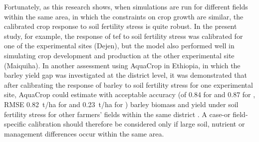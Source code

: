 Fortunately, as this research shows, when simulations are run for different fields within the same area, in which the constraints on crop growth are similar, the calibrated crop response to soil fertility stress is quite robust. In the present study, for example, the response of tef to soil fertility stress was calibrated for one of the experimental sites (Dejen), but the model also performed well in simulating crop development and production at the other experimental site (Maiquiha). In another assessment using AquaCrop in Ethiopia, in which the barley yield gap was investigated at the district level, it was demonstrated that after calibrating the response of barley to soil fertility stress for one experimental site, AquaCrop could estimate with acceptable accuracy (\Rsq of 0.84 for \B and 0.87 for \Y, RMSE \SI{0.82}{t/ha} for \B and \SI{0.23}{t/ha} for \Y) barley biomass and yield under soil fertility stress for other farmers' fields within the same district \parencite{abrha2013}. A case-or field-specific calibration should therefore be considered only if large soil, nutrient or management differences occur within the same area. 

